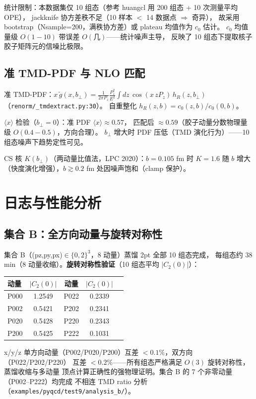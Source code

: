 \documentclass[11pt]{article}
\begin{document}
统计限制：本数据集仅 10 组态（参考 huangcl 用 200 组态 + 10 次测量平均 OPE），
jackknife 协方差秩不足（10 样本 $<$ 14 数据点 $\Rightarrow$ 奇异），
故采用 bootstrap（Nsample=200，满秩协方差）或 plateau 均值作为 $c_0$ 估计。
$c_0$ 均值量级 $O(1{-}10)$ 带误差 $O(\text{几})$——统计噪声主导，
反映了 10 组态下提取核子胶子矩阵元的信噪比极限。

\subsection{准 TMD-PDF 与 NLO 匹配}
准 TMD-PDF：$x\,\tilde{g}(x,b_\perp)=\frac{1}{2\pi P_z}\frac{P_z^2}{E^2}
\int dz\, \cos(x\,z P_z)\, h_R(z,b_\perp)$（\texttt{renorm/\_tmdextract.py:30}）。
自重整化 $h_R(z,b)=c_0(z,b)/c_0(0,b)$。

$\langle x\rangle$ 检验（$b_\perp{=}0$）：准 PDF $\langle x\rangle\approx0.57$，
匹配后 $\approx0.59$（胶子动量分数物理量级 $O(0.4{-}0.5)$，方向合理）。
$b_\perp$ 增大时 PDF 压低（TMD 演化行为）——10 组态噪声下趋势定性可见。

CS 核 $K(b_\perp)$（两动量比值法，LPC 2020）：$b{=}0.105$ fm 时 $K{=}1.6$
随 $b$ 增大（快度演化增强），$b\gtrsim0.2$ fm 处因噪声饱和（clamp 保护）。

\section{日志与性能分析}
\subsection{集合 B：全方向动量与旋转对称性}
集合 B（(pz,py,px)$\in\{0,2\}^3$，8 动量）蒸馏 2pt 全部 10 组态完成，
每组态约 38 min（8 动量收缩）。\textbf{旋转对称性验证}（10 组态平均 $|C_2(0)|$）：

\begin{center}
\begin{tabular}{lcccc}
\hline
动量 & $|C_2(0)|$ & 动量 & $|C_2(0)|$ \\
\hline
P000 & 1.2549 & P022 & 0.2339 \\
P002 & 0.5421 & P202 & 0.2341 \\
P020 & 0.5428 & P220 & 0.2343 \\
P200 & 0.5425 & P222 & 0.1031 \\
\hline
\end{tabular}
\end{center}

x/y/z 单方向动量（P002/P020/P200）互差 $<0.1\%$，双方向（P022/P202/P220）
互差 $<0.2\%$——所有组态严格满足 $O(3)$ 旋转对称性，蒸馏收缩与多动量
顶点计算正确性的强物理证明。集合 B 的 7 个非零动量（P002--P222）均完成
不相连 TMD ratio 分析（\texttt{examples/pyqcd/test9/analysis\_b/}）。
\end{document}
